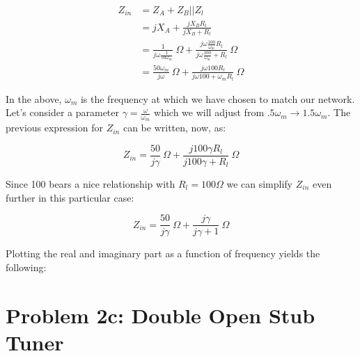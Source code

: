 \begin{align*}
    Z_{in} &= Z_A + Z_B||Z_l \\
           &= j X_A + \frac{j X_B R_l }{jX_B + R_l} \\
           &= \frac{1}{j \omega \frac{1}{50 \omega_m}}~\Omega + \frac{j \omega
\frac{100}{\omega_m}R_l}{j \omega \frac{100}{\omega_m} + R_l}~\Omega \\
&= \frac{50 \omega_m}{j \omega}~\Omega + \frac{j \omega 100 R_l}{j \omega 100 +
\omega_m R_l}~\Omega
\end{align*}

In the above, $\omega_m$ is the frequency at which we have chosen to match our
network. Let's consider a parameter $\gamma = \frac{\omega}{\omega_m}$ which we
will adjust from $.5\omega_m \rightarrow 1.5\omega_m$. The previous expression
for $Z_{in}$ can be written, now, as:

\[ 
        Z_{in} = \frac{50}{j \gamma}~\Omega + \frac{j 100 \gamma R_l}{j 100 \gamma +
        R_l}~\Omega
\]

Since 100 bears a nice relationship with $R_l = 100 \Omega $ we can simplify
$Z_{in}$ even further in this particular case:

\[ 
        Z_{in} = \frac{50}{j \gamma}~\Omega + \frac{j \gamma }{j \gamma +
        1}~\Omega
\]

Plotting the real and imaginary part as a function of frequency yields the
following:

\section*{Problem 2c: Double Open Stub Tuner}
